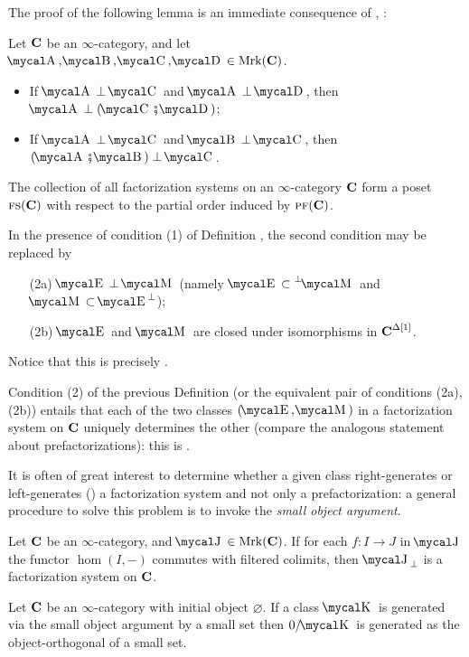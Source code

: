 \begin{definition}
The proof of the following lemma is an immediate consequence of \adef {}, :
\begin{lemma}
Let $\textbf{C}$ be an $\infty$\hyp{}category, and let $\mcal{A}, \mcal{B}, \mcal{C},\mcal{D} \in\mrk(\CC)$.
\begin{itemize}
\item If $\mcal{A}\perp \mcal{C}$ and $\mcal{A}\perp \mcal{D}$, then $\mcal{A}\perp (\mcal{C}\semicol \mcal{D})$;
\item If $\mcal{A}\perp \mcal{C}$ and $\mcal{B}\perp \mcal{C}$, then $(\mcal{A}\semicol \mcal{B})\perp \mcal{C}$.
\end{itemize}
\end{lemma}
\begin{remark}
The collection of all factorization systems on an $\infty$\hyp{}category $\textbf{C}$ form a poset $\text{\scshape fs}(\textbf{C})$ with respect to the partial order induced by $\text{\scshape pf}(\textbf{C})$.
\end{remark}
\begin{remark}
In the presence of condition (1) of Definition , the second condition may be replaced by
\begin{enumerate}
\item [(2a)] $\EE \perp \MM$ (namely $\EE\subset \prescript{\perp}{}{\MM}$ and $\MM\subset \EE^\perp$);
    \item [(2b)]  $\EE$ and $\MM$ are closed under
    isomorphisms in $\textbf{C}^{\Delta[1]}$.
\end{enumerate}
Notice that this is precisely \cite[Def. \textbf{5.2.8.8}]{HTT}.
\end{remark}
\begin{remark}\label{uniquely.determines.class}
Condition (2) of the previous Definition (or the equivalent pair of conditions (2a), (2b)) entails that each of the two classes $(\EE,\MM)$ in a factorization system on $\textbf{C}$ uniquely determines the other (compare the analogous statement about prefactorizations): this is \cite[Remark \textbf{5.2.8.12}]{HTT}.
\end{remark}
\end{definition}
It is often of great interest to determine whether a given class right\hyp{}generates or left\hyp{}generates (\adef {}) a factorization system and not only a prefactorization: a general procedure to solve this problem is to invoke the \emph{small object argument}.
\begin{theorem}
Let $\textbf{C}$ be an $\infty$\hyp{}category, and $\mcal{J}\in\mrk(\CC)$. If for each $f\colon I\to J$ in $\mcal{J}$ the functor $\hom(I,-)$ commutes with filtered colimits, then $\mcal{J}_\perp$ is a factorization system on $\textbf{C}$.
\end{theorem}
\begin{remark}\label{ortho.are.ortho}
Let $\textbf{C}$ be an $\infty$\hyp{}category with initial object $\varnothing$. If a class $\mcal{K}$ is generated via the small object argument by a small set then $0/\mcal{K}$ is generated as the object\hyp{}orthogonal of a small set.
\end{remark}
